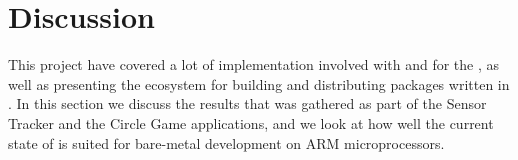
\chapter{Discussion}
\label{chap:discussion}

This project have covered a lot of implementation involved with {\rust} and {\C} for the {\gecko}, as well as presenting the ecosystem for building and distributing packages written in {\rust}.
In this section we discuss the results that was gathered as part of the Sensor Tracker and the Circle Game applications, and we look at how well the current state of {\rust} is suited for bare-metal development on ARM microprocessors.





%
